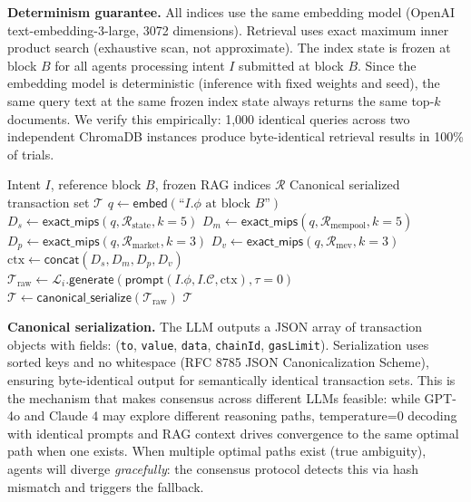 \documentclass[11pt]{article}
\begin{document}
\textbf{Determinism guarantee.} All indices use the same embedding model (OpenAI text-embedding-3-large, 3072 dimensions). Retrieval uses exact maximum inner product search (exhaustive scan, not approximate). The index state is frozen at block $B$ for all agents processing intent $I$ submitted at block $B$. Since the embedding model is deterministic (inference with fixed weights and seed), the same query text at the same frozen index state always returns the same top-$k$ documents. We verify this empirically: 1,000 identical queries across two independent ChromaDB instances produce byte-identical retrieval results in 100\% of trials.

\begin{algorithm}[t]
\caption{Deterministic Transaction Path Generation}
\label{alg:rag_generation}
\begin{algorithmic}[1]
\Require Intent $I$, reference block $B$, frozen RAG indices $\mathcal{R}$
\Ensure Canonical serialized transaction set $\mathcal{T}$
\State $q \gets \mathsf{embed}(\text{``}I.\phi \text{ at block } B\text{''})$ 
\State $D_s \gets \mathsf{exact\_mips}(q, \mathcal{R}_{\text{state}}, k=5)$
\State $D_m \gets \mathsf{exact\_mips}(q, \mathcal{R}_{\text{mempool}}, k=5)$
\State $D_p \gets \mathsf{exact\_mips}(q, \mathcal{R}_{\text{market}}, k=3)$
\State $D_v \gets \mathsf{exact\_mips}(q, \mathcal{R}_{\text{mev}}, k=3)$
\State $\text{ctx} \gets \mathsf{concat}(D_s, D_m, D_p, D_v)$
\State $\mathcal{T}_{\text{raw}} \gets \mathcal{L}_i.\mathsf{generate}(\mathsf{prompt}(I.\phi, I.\mathcal{C}, \text{ctx}), \tau=0)$
\State $\mathcal{T} \gets \mathsf{canonical\_serialize}(\mathcal{T}_{\text{raw}})$ 
\State \Return $\mathcal{T}$
\end{algorithmic}
\end{algorithm}

\textbf{Canonical serialization.} The LLM outputs a JSON array of transaction objects with fields: (\texttt{to}, \texttt{value}, \texttt{data}, \texttt{chainId}, \texttt{gasLimit}). Serialization uses sorted keys and no whitespace (RFC 8785 JSON Canonicalization Scheme), ensuring byte-identical output for semantically identical transaction sets. This is the mechanism that makes consensus across different LLMs feasible: while GPT-4o and Claude 4 may explore different reasoning paths, temperature=0 decoding with identical prompts and RAG context drives convergence to the same optimal path when one exists. When multiple optimal paths exist (true ambiguity), agents will diverge \emph{gracefully}: the consensus protocol detects this via hash mismatch and triggers the fallback.
\end{document}
